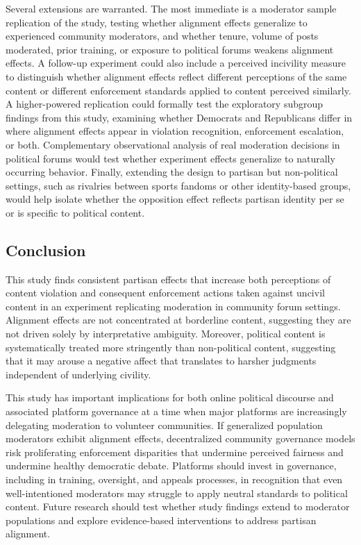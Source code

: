 \documentclass[12pt]{article}
\begin{document}
Several extensions are warranted. The most immediate is a moderator sample replication of the study, testing whether alignment effects generalize to experienced community moderators, and whether tenure, volume of posts moderated, prior training, or exposure to political forums weakens alignment effects. A follow-up experiment could also include a perceived incivility measure to distinguish whether alignment effects reflect different perceptions of the same content or different enforcement standards applied to content perceived similarly. A higher-powered replication could formally test the exploratory subgroup findings from this study, examining whether Democrats and Republicans differ in where alignment effects appear in violation recognition, enforcement escalation, or both. Complementary observational analysis of real moderation decisions in political forums would test whether experiment effects generalize to naturally occurring behavior. Finally, extending the design to partisan but non-political settings, such as rivalries between sports fandoms or other identity-based groups, would help isolate whether the opposition effect reflects partisan identity per se or is specific to political content.

\subsection{Conclusion}

This study finds consistent partisan effects that increase both perceptions of content violation and consequent enforcement actions taken against uncivil content in an experiment replicating moderation in community forum settings. Alignment effects are not concentrated at borderline content, suggesting they are not driven solely by interpretative ambiguity. Moreover, political content is systematically treated more stringently than non-political content, suggesting that it may arouse a negative affect that translates to harsher judgments independent of underlying civility.

This study has important implications for both online political discourse and associated platform governance at a time when major platforms are increasingly delegating moderation to volunteer communities. If generalized population moderators exhibit alignment effects, decentralized community governance models risk proliferating enforcement disparities that undermine perceived fairness and undermine healthy democratic debate. Platforms should invest in governance, including in training, oversight, and appeals processes, in recognition that even well-intentioned moderators may struggle to apply neutral standards to political content. Future research should test whether study findings extend to moderator populations and explore evidence-based interventions to address partisan alignment.
\end{document}
